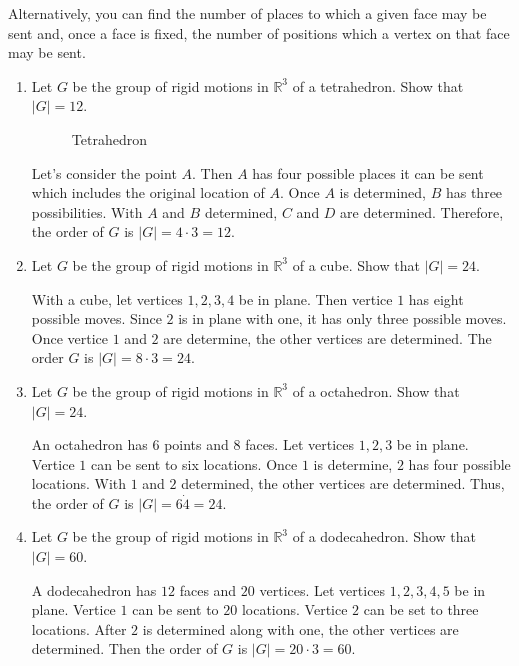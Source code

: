 Alternatively, you can find the number of places to which a given  face may be
sent and, once a face is fixed, the number of positions which a vertex on that
face may be sent.
\begin{enumerate}[resume]
\item
  Let \(G\) be the group of rigid motions in \(\mathbb{R}^3\) of a tetrahedron.
  Show that \(\lvert G\rvert = 12\).
  \begin{figure}[H]
    \centering
    
    \caption{Tetrahedron}
    \label{tetrahedron}
  \end{figure}
  Let's consider the point \(A\).
  Then \(A\) has four possible places it can be sent which includes the
  original location of \(A\).
  Once \(A\) is determined, \(B\) has three possibilities.
  With \(A\) and \(B\) determined, \(C\) and \(D\) are determined.
  Therefore, the order of \(G\) is \(\lvert G\rvert = 4\cdot 3 = 12\).
\item
  Let \(G\) be the group of rigid motions in \(\mathbb{R}^3\) of a cube.
  Show that \(\lvert G\rvert = 24\).
  \par\smallskip
  With a cube, let vertices \(1,2,3,4\) be in plane.
  Then vertice \(1\) has eight possible moves.
  Since \(2\) is in plane with one, it has only three possible moves.
  Once vertice \(1\) and \(2\) are determine, the other vertices are
  determined.
  The order \(G\) is \(\lvert G\rvert = 8\cdot 3 = 24\).
\item
  Let \(G\) be the group of rigid motions in \(\mathbb{R}^3\) of a octahedron.
  Show that \(\lvert G\rvert = 24\).
  \par\smallskip
  An octahedron has \(6\) points and \(8\) faces.
  Let vertices \(1,2,3\) be in plane.
  Vertice \(1\) can be sent to six locations.
  Once \(1\) is determine, \(2\) has four possible locations.
  With \(1\) and \(2\) determined, the other vertices are determined.
  Thus, the order of \(G\) is \(\lvert G\rvert = 6\dot 4 = 24\).
\item
  Let \(G\) be the group of rigid motions in \(\mathbb{R}^3\) of a
  dodecahedron.
  Show that \(\lvert G\rvert = 60\).
  \par\smallskip
  A dodecahedron has \(12\) faces and \(20\) vertices.
  Let vertices \(1,2,3,4,5\) be in plane.
  Vertice \(1\) can be sent to \(20\) locations.
  Vertice \(2\) can be set to three locations.
  After \(2\) is determined along with one, the other vertices are determined.
  Then the order of \(G\) is \(\lvert G\rvert = 20\cdot 3 = 60\).

\end{enumerate}

